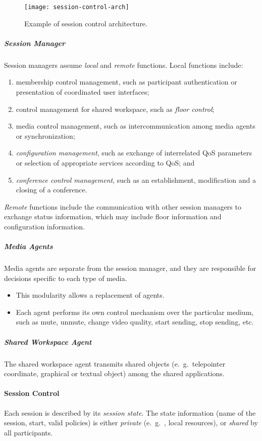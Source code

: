 \begin{figure}[ht]
	\centering
	\texttt{[image: session-control-arch]}
	\caption{Example of session control architecture.}\label{fig:session-control-arch}
\end{figure}

\subparagraph{Session Manager}
	Session managers assume \textit{local} and \textit{remote} functions. Local functions include:
		\begin{enumerate}
			\item membership control management, such as participant authentication or presentation of coordinated user interfaces;
			\item control management for shared workspace, such as \textit{floor control};
			\item media control management, such as intercommunication among media agents or synchronization;
			\item \textit{configuration management}, such as exchange of interrelated QoS parameters or selection of appropriate services according to QoS; and
			\item \textit{conference control management}, such as an establishment, modification and a closing of a conference.
		\end{enumerate}
	
\textit{Remote} functions include the communication with other session managers to exchange status information, which may include floor information and configuration information.
	
\subparagraph{Media Agents}	
Media agents are separate from the session manager, and they are responsible for decisions specific to each type of media. 
\begin{itemize}
	\item This modularity allows a replacement of agents. 
	\item Each agent performs its own control mechanism over the particular medium, such as mute, unmute, change video quality, start sending, stop sending, etc.
\end{itemize}


\subparagraph{Shared Workspace Agent}
The shared workspace agent transmits shared objects (e.\ g.\ telepointer coordinate, graphical or textual object) among the shared applications.

\paragraph{Session Control}
Each session is described by its \textit{session state}. The state information (name of the session, start, valid policies) is either \textit{private} (e.\ g.\ , local resources), or \textit{shared} by all participants.

